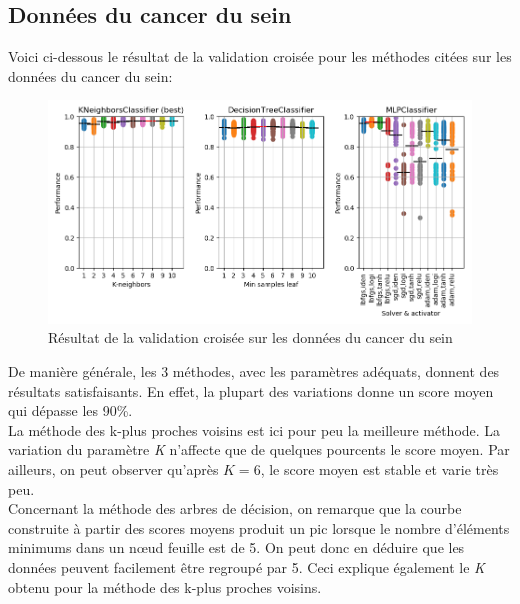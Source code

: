 \documentclass[11pt, a4paper]{article}
\begin{document}
\newpage

\subsection{Données du cancer du sein}

Voici ci-dessous le résultat de la validation croisée pour les méthodes citées sur les données du cancer du sein:

\begin{figure}[H]
    \begin{center}
        \includegraphics[width=1\textwidth]{ex2_breastcancer}
    \end{center}
    \caption{Résultat de la validation croisée sur les données du cancer du sein}
    \label{Résultat de la validation croisée sur les données du cancer du sein}
\end{figure}

De manière générale, les 3 méthodes, avec les paramètres adéquats, donnent des résultats satisfaisants.
En effet, la plupart des variations donne un score moyen qui dépasse les 90\%. \\

La méthode des k-plus proches voisins est ici pour peu la meilleure méthode.
La variation du paramètre \textit{K} n'affecte que de quelques pourcents le score moyen.
Par ailleurs, on peut observer qu'après $K = 6$,
le score moyen est stable et varie très peu. \\

Concernant la méthode des arbres de décision,
on remarque que la courbe construite à partir des scores moyens produit un pic lorsque
le nombre d'éléments minimums dans un nœud feuille est de 5.
On peut donc en déduire que les données peuvent facilement être regroupé par 5.
Ceci explique également le \textit{K} obtenu pour la méthode des k-plus proches voisins. \\
\end{document}
